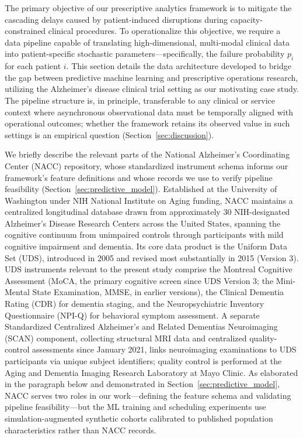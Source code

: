 \documentclass[11pt,a4paper]{article}
\begin{document}
The primary objective of our prescriptive analytics framework is to mitigate the cascading delays caused by patient-induced disruptions during capacity-constrained clinical procedures. To operationalize this objective, we require a data pipeline capable of translating high-dimensional, multi-modal clinical data into patient-specific stochastic parameters---specifically, the failure probability $p_i$ for each patient $i$. This section details the data architecture developed to bridge the gap between predictive machine learning and prescriptive operations research, utilizing the Alzheimer's disease clinical trial setting as our motivating case study. The pipeline structure is, in principle, transferable to any clinical or service context where asynchronous observational data must be temporally aligned with operational outcomes; whether the framework retains its observed value in such settings is an empirical question (Section~\ref{sec:discussion}).

We briefly describe the relevant parts of the National Alzheimer's Coordinating Center (NACC) repository, whose standardized instrument schema informs our framework's feature definitions and whose records we use to verify pipeline feasibility (Section~\ref{sec:predictive_model}). Established at the University of Washington under NIH National Institute on Aging funding, NACC maintains a centralized longitudinal database drawn from approximately 30 NIH-designated Alzheimer's Disease Research Centers across the United States, spanning the cognitive continuum from unimpaired controls through participants with mild cognitive impairment and dementia. Its core data product is the Uniform Data Set (UDS), introduced in 2005 and revised most substantially in 2015 (Version 3). UDS instruments relevant to the present study comprise the Montreal Cognitive Assessment (MoCA, the primary cognitive screen since UDS Version 3; the Mini-Mental State Examination, MMSE, in earlier versions), the Clinical Dementia Rating (CDR) for dementia staging, and the Neuropsychiatric Inventory Questionnaire (NPI-Q) for behavioral symptom assessment. A separate Standardized Centralized Alzheimer's and Related Dementias Neuroimaging (SCAN) component, collecting structural MRI data and centralized quality-control assessments since January 2021, links neuroimaging examinations to UDS participants via unique subject identifiers; quality control is performed at the Aging and Dementia Imaging Research Laboratory at Mayo Clinic. As elaborated in the paragraph below and demonstrated in Section~\ref{sec:predictive_model}, NACC serves two roles in our work---defining the feature schema and validating pipeline feasibility---but the ML training and scheduling experiments use simulation-augmented synthetic cohorts calibrated to published population characteristics rather than NACC records.
\end{document}
